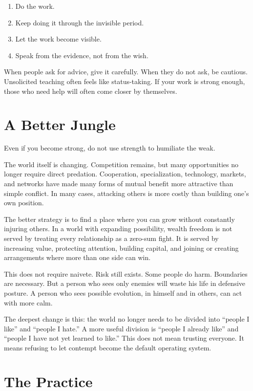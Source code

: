 \begin{enumerate}
\item Do the work.
\item Keep doing it through the invisible period.
\item Let the work become visible.
\item Speak from the evidence, not from the wish.
\end{enumerate}

When people ask for advice, give it carefully. When they do not ask, be cautious. Unsolicited teaching often feels like status-taking. If your work is strong enough, those who need help will often come closer by themselves.

\section*{A Better Jungle}

Even if you become strong, do not use strength to humiliate the weak.

The world itself is changing. Competition remains, but many opportunities no longer require direct predation. Cooperation, specialization, technology, markets, and networks have made many forms of mutual benefit more attractive than simple conflict. In many cases, attacking others is more costly than building one's own position.

The better strategy is to find a place where you can grow without constantly injuring others. In a world with expanding possibility, wealth freedom is not served by treating every relationship as a zero-sum fight. It is served by increasing value, protecting attention, building capital, and joining or creating arrangements where more than one side can win.

This does not require naivete. Risk still exists. Some people do harm. Boundaries are necessary. But a person who sees only enemies will waste his life in defensive posture. A person who sees possible evolution, in himself and in others, can act with more calm.

The deepest change is this: the world no longer needs to be divided into ``people I like'' and ``people I hate.'' A more useful division is ``people I already like'' and ``people I have not yet learned to like.'' This does not mean trusting everyone. It means refusing to let contempt become the default operating system.

\section*{The Practice}

